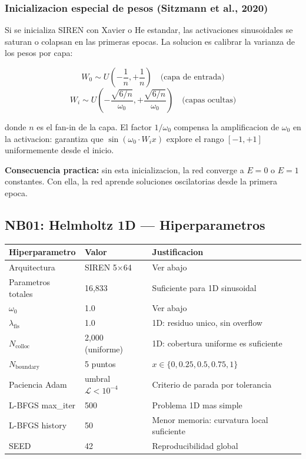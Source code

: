 \subsubsection*{Inicializacion especial de pesos (Sitzmann et al., 2020)}

\begin{tcolorbox}[colback=gray!5, colframe=ujatgray, breakable]
Si se inicializa SIREN con Xavier o He estandar, las activaciones sinusoidales
se saturan o colapsan en las primeras epocas. La solucion es calibrar la varianza
de los pesos por capa:

\[
  W_0 \sim U\!\left(-\frac{1}{n}, +\frac{1}{n}\right)  \quad \text{(capa de entrada)}
\]
\[
  W_i \sim U\!\left(-\frac{\sqrt{6/n}}{\omega_0}, +\frac{\sqrt{6/n}}{\omega_0}\right)
  \quad \text{(capas ocultas)}
\]

donde $n$ es el fan-in de la capa. El factor $1/\omega_0$ compensa la amplificacion
de $\omega_0$ en la activacion: garantiza que $\sin(\omega_0 \cdot W_i x)$ explore
el rango $[-1, +1]$ uniformemente desde el inicio.

\textbf{Consecuencia practica:} sin esta inicializacion, la red converge a $E = 0$
o $E = 1$ constantes. Con ella, la red aprende soluciones oscilatorias desde
la primera epoca.
\end{tcolorbox}

\vspace{10pt}

\subsection{NB01: Helmholtz 1D --- Hiperparametros}

\begin{tcolorbox}[colback=slidelightblue!30, colframe=ujatblue,
  title={\bfseries Configuracion NB01}, coltitle=white, breakable]
\begin{tabular}{@{}lll@{}}
\toprule
\textbf{Hiperparametro} & \textbf{Valor} & \textbf{Justificacion} \\
\midrule
Arquitectura & SIREN 5$\times$64 & Ver abajo \\
Parametros totales & 16,833 & Suficiente para 1D sinusoidal \\
$\omega_0$ & 1.0 & Ver abajo \\
$\lambda_\text{fis}$ & 1.0 & 1D: residuo unico, sin overflow \\
$N_\text{colloc}$ & 2,000 (uniforme) & 1D: cobertura uniforme es suficiente \\
$N_\text{boundary}$ & 5 puntos & $x \in \{0, 0.25, 0.5, 0.75, 1\}$ \\
Paciencia Adam & umbral $\mathcal{L} < 10^{-4}$ & Criterio de parada por tolerancia \\
L-BFGS max\_iter & 500 & Problema 1D mas simple \\
L-BFGS history & 50 & Menor memoria: curvatura local suficiente \\
SEED & 42 & Reproducibilidad global \\
\bottomrule
\end{tabular}
\end{tcolorbox}

